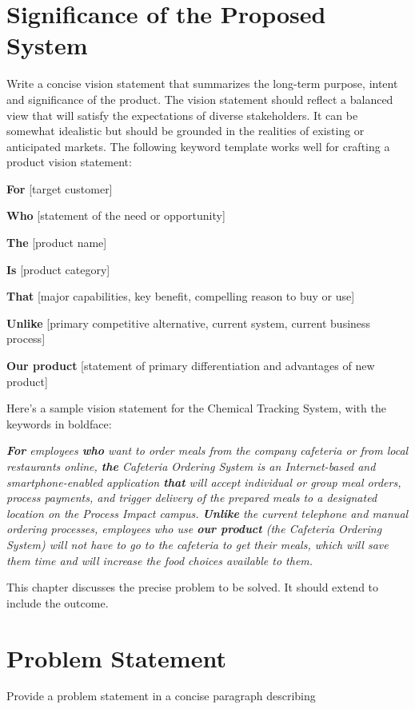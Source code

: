 \documentclass[A4paper,12pt]{report}
\theoremstyle{plain}
\theoremstyle{definition}
\theoremstyle{remark}
\numberwithin{equation}{section}
\begin{document}
\section{Significance of the Proposed System}
Write a concise vision statement that summarizes the long-term purpose, intent and significance of the product. The vision statement should reflect a balanced view that will satisfy the expectations of diverse stakeholders. It can be somewhat idealistic but should be grounded in the realities of existing or anticipated markets. The following keyword template works well for crafting a product vision statement:

\textbf{For} [target customer]

\textbf{Who} [statement of the need or opportunity]

\textbf{The} [product name]

\textbf{Is} [product category]

\textbf{That} [major capabilities, key benefit, compelling reason to buy or use]

\textbf{Unlike} [primary competitive alternative, current system, current business process]

\textbf{Our product} [statement of primary differentiation and advantages of new product]

Here’s a sample vision statement for the Chemical Tracking System, with the keywords in boldface:

\textit{\textbf{For} employees \textbf{who} want to order meals from the company cafeteria or from local restaurants online, \textbf{the} Cafeteria Ordering System is an Internet-based and smartphone-enabled application \textbf{that} will accept individual or group meal orders, process payments, and trigger delivery of the prepared meals to a designated location on the Process Impact campus. \textbf{Unlike} the current telephone and manual ordering processes, employees who use \textbf{our product} (the Cafeteria Ordering System) will not have to go to the cafeteria to get their meals, which will save them time and will increase the food choices available to them.}


This chapter discusses the precise problem to be solved. It should extend to include the outcome.

\section{Problem Statement}

Provide a problem statement in a concise paragraph describing 
\end{document}
